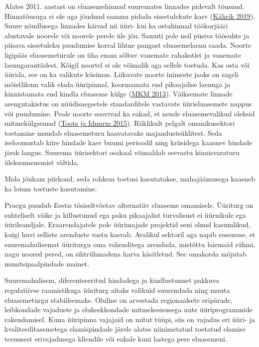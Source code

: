 \documentclass[estonian,]{article}
\begin{document}
Alates 2011. aastast on eluasemehinnad suuremates linnades pidevalt tõusnud. Hinnatõusuga ei ole aga jõudnud sammu pidada sissetulekute kasv (\protect\hyperlink{Kuxe4hrik2019}{Kährik 2019}). Suure nõudlusega linnades käivad nii üüri- kui ka ostuhinnad töökarjääri alustavale noorele või noorele perele üle jõu. Samuti pole neil püsiva töösuhte ja piisava sissetuleku puudumise korral lihtne pangast eluasemelaenu saada. Noorte ligipääs eluasemeturule on üha enam sõltuv vanemate rahakotist ja vanemate laenugarantiidest. Kõigil noortel ei ole võimalik aga sellele toetuda. Kas osta või üürida, see on ka valikute küsimus. Liikuvate noorte inimeste jaoks on sageli mõistlikum valik elada üüripinnal, koormamata end pikaajalise laenuga ja kinnistamata end kindla eluaseme külge (\protect\hyperlink{MKM2013}{MKM 2013}). Väiksemate linnade arengutakistus on nüüdisaegsetele standarditele vastavate üürieluasemete nappus või puudumine. Peale noorte soovivad ka eakad, et nende eluasemevalikud oleksid mitmekülgsemad (\protect\hyperlink{Toots2015}{Toots ja Idnurm 2015}). Riiklikult pelgalt omanikusektori toetamine muudab eluasemeturu haavatavaks majandustsüklitest. Seda iseloomustab kiire hindade kasv buumi perioodil ning kriisidega kaasnev hindade järsk langus. Suurema üürisektori osakaal võimaldab seevastu kinnisvaraturu ülekuumenemist vältida.

\begin{blockquote-left}
Mida jõukam piirkond, seda rohkem toetusi kasutatakse, mahajäämusega
kaasneb ka loium toetuste kasutamine.
\end{blockquote-left}

Praegu puudub Eestis tõsiseltvõetav alternatiiv eluaseme omamisele. Üüriturg on suhteliselt väike ja killustunud ega paku pikaajalist turvalisust ei üürnikule ega üürileandjale. Eraarendajatele pole üürimajade projektid seni olnud kasumlikud, kuigi huvi selliste arenduste vastu kasvab. Avalikul sektoril aga napib ressursse, et suuremahulisemat üüriturgu oma vahenditega arendada, mistõttu laiemaid rühmi, nagu noored pered, on sihtrühmadena harva käsitletud. See omakorda mõjutab munitsipaalpindade mainet.

Suuremahulisem, diferentseeritud hindadega ja kindlustunnet pakkuva regulatiivse raamistikuga üüriturg aitaks valikuid suurendada ning muuta eluasemeturgu stabiilsemaks. Oluline on arvestada regionaalsete eripärade, leibkondade vajaduste ja elukeskkondade mitmekesisusega uute üüriprogrammide rakendamisel. Kuna üüripinna vajajaid on mitut tüüpi, siis on vajadus eri üüri- ja kvaliteeditasemetega elamispindade järele alates niinimetatud toetatud elamise teenusest erivajadusega kliendile või eakale kuni lastega pere eluasemeni.
\end{document}
